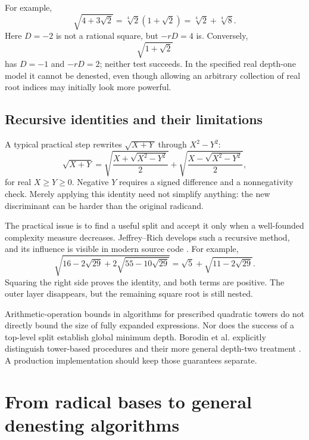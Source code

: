 \documentclass[11pt,a4paper]{article}
\numberwithin{equation}{section}
\theoremstyle{definition}\newtheorem{definition}[theorem]{Definition}
\theoremstyle{remark}\newtheorem{remark}[theorem]{Remark}
\begin{document}
For example,
\begin{equation}
\sqrt{4+3\sqrt2}=\sqrt[4]2(1+\sqrt2)
=\sqrt[4]2+\sqrt[4]8.
\end{equation}
Here $D=-2$ is not a rational square, but $-rD=4$ is. Conversely,
\[
\sqrt{1+\sqrt2}
\]
has $D=-1$ and $-rD=2$; neither test succeeds. In the specified real depth-one model it cannot be denested, even though allowing an arbitrary collection of real root indices may initially look more powerful.

\subsection{Recursive identities and their limitations}
A typical practical step rewrites $\sqrt{X+Y}$ through $X^2-Y^2$:
\begin{equation}\label{eq:recursive}
\sqrt{X+Y}
=\sqrt{\frac{X+\sqrt{X^2-Y^2}}2}
+\sqrt{\frac{X-\sqrt{X^2-Y^2}}2},
\end{equation}
for real $X\ge Y\ge0$. Negative $Y$ requires a signed difference and a nonnegativity check. Merely applying this identity need not simplify anything: the new discriminant can be harder than the original radicand.

The practical issue is to find a useful split and accept it only when a well-founded complexity measure decreases. Jeffrey--Rich develops such a recursive method, and its influence is visible in modern source code \cite{jeffrey,sympysrc,raddenestsrc}. For example,
\begin{equation}\label{eq:depth3}
\sqrt{16-2\sqrt{29}+2\sqrt{55-10\sqrt{29}}}
=\sqrt5+\sqrt{11-2\sqrt{29}}.
\end{equation}
Squaring the right side proves the identity, and both terms are positive. The outer layer disappears, but the remaining square root is still nested.

Arithmetic-operation bounds in algorithms for prescribed quadratic towers do not directly bound the size of fully expanded expressions. Nor does the success of a top-level split establish global minimum depth. Borodin et al. explicitly distinguish tower-based procedures and their more general depth-two treatment \cite{bfht}. A production implementation should keep those guarantees separate.

\section{From radical bases to general denesting algorithms}
\label{sec:theory}
\end{document}
